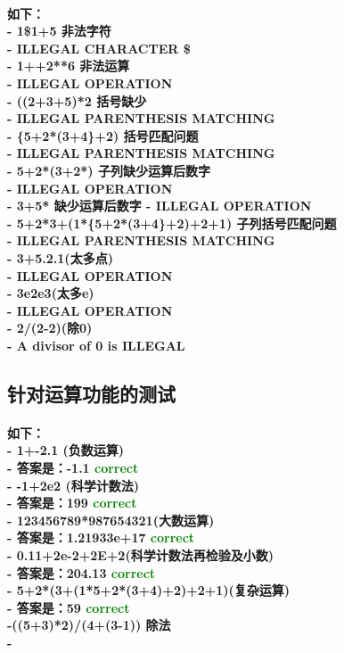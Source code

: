 \documentclass[UTF8]{ctexart}
\begin{document}
\paragraph{
如下：\\
- 1\$1+5  非法字符\\
- ILLEGAL CHARACTER \$ \\
- 1++2**6 非法运算\\
- ILLEGAL OPERATION \\
- ((2+3+5)*2 括号缺少\\
- ILLEGAL PARENTHESIS MATCHING \\
- \{5+2*(3+4\}+2) 括号匹配问题\\
- ILLEGAL PARENTHESIS MATCHING \\
- 5+2*(3+2*) 子列缺少运算后数字\\
- ILLEGAL OPERATION \\
- 3+5* 缺少运算后数字
- ILLEGAL OPERATION\\
- 5+2*3+(1*\{5+2*(3+4\}+2)+2+1) 子列括号匹配问题\\
- ILLEGAL PARENTHESIS MATCHING \\
- 3+5.2.1(太多点)\\
- ILLEGAL OPERATION\\
- 3e2e3(太多e)\\
- ILLEGAL OPERATION \\
- 2/(2-2)(除0)\\
- A divisor of 0 is ILLEGAL
}
\subsection{针对运算功能的测试}
\paragraph{
如下：\\
- 1+-2.1 (负数运算)\\
- 答案是：-1.1 \textcolor{green}{correct}\\
- -1+2e2 (科学计数法)\\
- 答案是：199 \textcolor{green}{correct}\\
- 123456789*987654321(大数运算)\\
- 答案是：1.21933e+17 \textcolor{green}{correct}\\
- 0.11+2e-2+2E+2(科学计数法再检验及小数)\\
- 答案是：204.13 \textcolor{green}{correct}\\
- 5+2*(3+(1*5+2*(3+4)+2)+2+1)(复杂运算)\\
- 答案是：59 \textcolor{green}{correct}\\
-((5+3)*2)/(4+(3-1)) {除法}\\
- 
}
\end{document}
